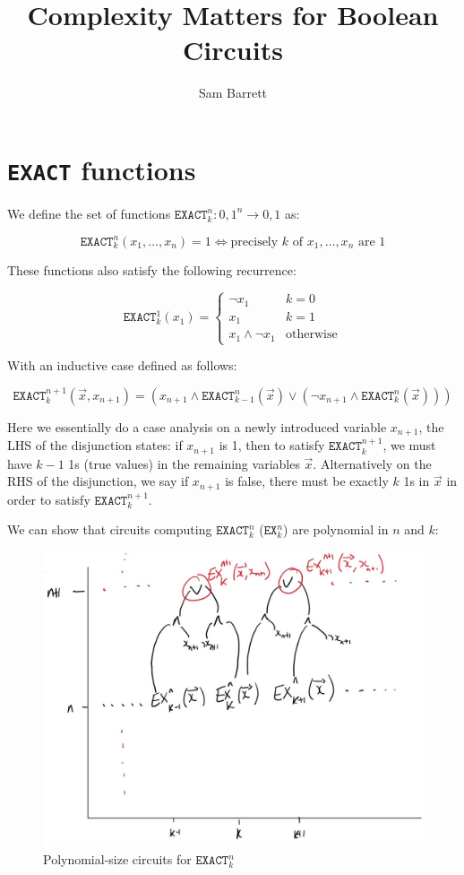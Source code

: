 \documentclass{article}
\title{Complexity Matters for Boolean Circuits}
\author{Sam Barrett}
\begin{document}
    \section{\texttt{EXACT} functions}

    We define the set of functions $\texttt{EXACT}_{k}^{n} : { 0,1 }^{n} \rightarrow { 0,1 } $ as:

    \[
      \texttt{EXACT}_{k}^{n}(x_{1}, \ldots, x_{n}) = 1 \Longleftrightarrow \text{precisely } k \text{ of } x_{1},\ldots,x_{n} \text{ are } 1
    \]

    These functions also satisfy the following recurrence:

    \[
      \texttt{EXACT} _{k}^{1}(x_{1}) = \begin{cases}
        \neg x_{1} & k=0 \\
        x_{1} & k=1\\
        x_{1} \wedge \neg x_{1} & \text{otherwise}
      \end{cases}
    \]

    With an inductive case defined as follows:

    \[
      \texttt{EXACT}_{k}^{n+1}(\vec{x}, x_{n+1}) = (x_{n+1}\wedge \texttt{EXACT}_{k-1}^{n}(\vec{x}) \vee (\neg x_{n+1} \wedge \texttt{EXACT}_{k}^{n}(\vec{x}) ))
    \]

    Here we essentially do a case analysis on a newly introduced variable $x_{n+1}$, the LHS of the disjunction states: if $x_{n+1}$ is 1, then to satisfy $\texttt{EXACT}_{k}^{n+1} $, we must have $k-1$ 1s (true values) in the remaining variables $\vec{x}$. Alternatively on the RHS of the disjunction, we say if $x_{n+1}$ is false, there must be exactly $k$  1s in $\vec{x}$ in order to satisfy $\texttt{EXACT}_{k}^{n+1} $.


    We can show that circuits computing $\texttt{EXACT}_{k}^{n} $ ($\texttt{EX}_{k}^{n} $) are polynomial in $n$ and $k$:

    \begin{figure}[ht]
      \centering
      \includegraphics[scale=0.4]{figures/polycircuits}
      \caption{\label{fig:polycircuits} Polynomial-size circuits for $\texttt{EXACT}_{k}^{n} $}
    \end{figure}
\end{document}
